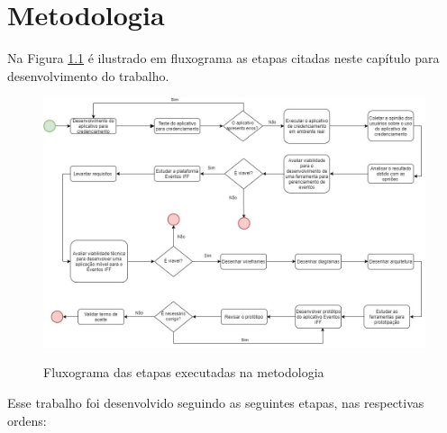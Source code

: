 \chapter{Metodologia}

Na Figura \ref{fig:metodologia} é ilustrado em fluxograma as etapas citadas neste capítulo para desenvolvimento do trabalho.

\begin{figure}[H]
    \centering
    \caption{Fluxograma das etapas executadas na metodologia}
    \includegraphics[scale=0.45]{figuras/metodologia.jpg}
    \label{fig:metodologia}
\end{figure}

Esse trabalho foi desenvolvido seguindo as seguintes etapas, nas respectivas ordens: 

